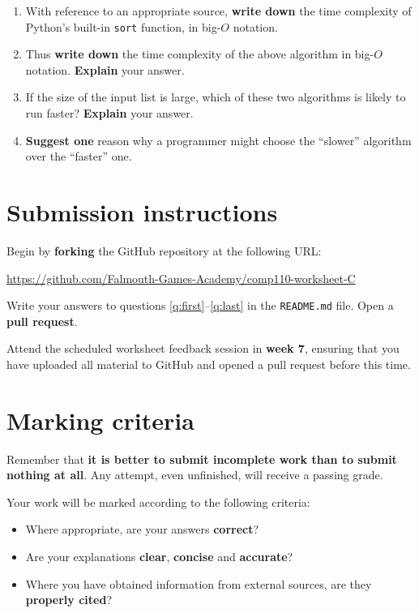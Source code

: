 \documentclass{../../../fal_assignment}
\begin{document}
\begin{enumerate}[resume,label=(\alph*)]
	\item With reference to an appropriate source, \textbf{write down} the time complexity of Python's built-in
		\lstinline{sort} function, in big-$O$ notation.
	\item Thus \textbf{write down} the time complexity of the above algorithm in big-$O$ notation.
		\textbf{Explain} your answer.
	\item If the size of the input list is large, which of these two algorithms is likely to run faster?
		\textbf{Explain} your answer.
	\item \textbf{Suggest one} reason why a programmer might choose the ``slower'' algorithm
		over the ``faster'' one.
	\label{q:last}
\end{enumerate}

\section*{Submission instructions}

Begin by \textbf{forking} the GitHub repository at the following URL:

\url{https://github.com/Falmouth-Games-Academy/comp110-worksheet-C}

Write your answers to questions \ref{q:first}--\ref{q:last} in the \texttt{README.md} file.
Open a \textbf{pull request}.

Attend the scheduled worksheet feedback session in \textbf{week 7},
ensuring that you have uploaded all material to GitHub and opened a pull request before this time.

\section*{Marking criteria}

Remember that \textbf{it is better to submit incomplete work than to submit nothing at all}.
Any attempt, even unfinished, will receive a passing grade.

Your work will be marked according to the following criteria:
\begin{itemize}
	\item Where appropriate, are your answers \textbf{correct}?
	\item Are your explanations \textbf{clear}, \textbf{concise} and \textbf{accurate}?
	\item Where you have obtained information from external sources, are they \textbf{properly cited}?
\end{itemize}
\end{document}
